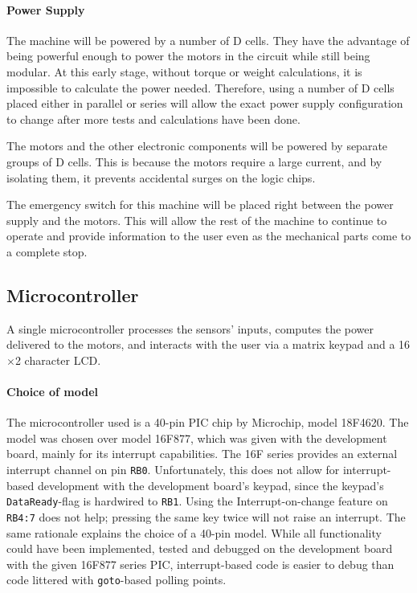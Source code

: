 \documentclass[11pt]{report}
\begin{document}
\paragraph{Power Supply}
The machine will be powered by a number of D cells. They have the advantage of being powerful enough to power the motors in the circuit while still being modular. At this early stage, without torque or weight calculations, it is impossible to calculate the power needed. Therefore, using a number of D cells placed either in parallel or series will allow the exact power supply configuration to change after more tests and calculations have been done.

The motors and the other electronic components will be powered by separate groups of D cells. This is because the motors require a large current, and by isolating them, it prevents accidental surges on the logic chips.

The emergency switch for this machine will be placed right between the power supply and the motors. This will allow the rest of the machine to continue to operate and provide information to the user even as the mechanical parts come to a complete stop.


\subsection{Microcontroller}
A single microcontroller processes the sensors' inputs, computes the power delivered to the motors, and interacts with the user via a matrix keypad and a 16$\times$2 character LCD. 
\paragraph{Choice of model}
The microcontroller used is a 40-pin PIC chip by Microchip, model 18F4620. The model was chosen over model 16F877, which was given with the development board, mainly for its interrupt capabilities. The 16F series provides an external interrupt channel on pin \texttt{RB0}. Unfortunately, this does not allow for interrupt-based development with the development board's keypad, since the keypad's \texttt{DataReady}-flag is hardwired to \texttt{RB1}. Using the Interrupt-on-change feature on \texttt{RB4:7} does not help; pressing the same key twice will not raise an interrupt. The same rationale explains the choice of a 40-pin model. While all functionality could have been implemented, tested and debugged on the development board with the given 16F877 series PIC, interrupt-based code is easier to debug than code littered with \texttt{goto}-based polling points.  
\end{document}
